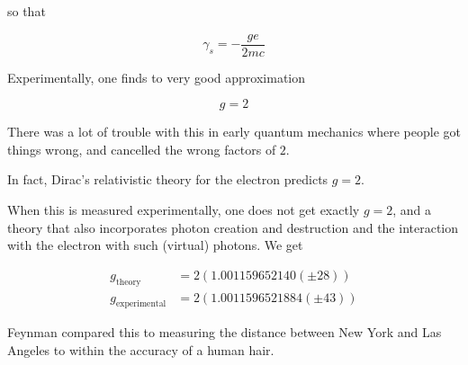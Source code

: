so that

\begin{equation}\label{eqn:qmTwoL15:370}
\gamma_s = - \frac{g e}{ 2 m c} 
\end{equation}

Experimentally, one finds to very good approximation

\begin{equation}\label{eqn:qmTwoL15:390}
g = 2
\end{equation}

There was a lot of trouble with this in early quantum mechanics where people got things wrong, and cancelled the wrong factors of $2$.

In fact, Dirac's relativistic theory for the electron predicts $g=2$.

When this is measured experimentally, one does not get exactly $g=2$, and a theory that also incorporates photon creation and destruction and the interaction with the electron with such (virtual) photons.  We get

\begin{equation}\label{eqn:qmTwoL15:410}
\begin{aligned}
g_{\text{theory}} 
&= 2 \left(
1.001159652140 (\pm 28)
\right) \\
g_{\text{experimental}} 
&= 2 \left(
1.0011596521884 (\pm 43)
\right)
\end{aligned}
\end{equation}

Feynman compared this to measuring the distance between New York and Las Angeles to within the accuracy of a human hair.

\EndArticle
